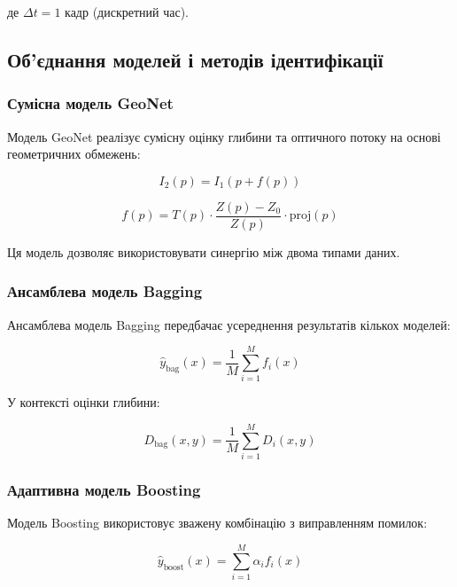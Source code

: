 \documentclass[14pt, a4paper]{extarticle}
\numberwithin{equation}{section}
\begin{document}
де $\Delta t = 1$ кадр (дискретний час).

\subsection{Об'єднання моделей і методів ідентифікації}

\subsubsection{Сумісна модель GeoNet}

Модель GeoNet реалізує сумісну оцінку глибини та оптичного потоку на основі геометричних обмежень:

\begin{equation}
\boxed{I_2(p) = I_1(p + f(p))} \tag{3.29}
\end{equation}

\begin{equation}
f(p) = T(p) \cdot \frac{Z(p) - Z_0}{Z(p)} \cdot \text{proj}(p) \tag{3.30}
\end{equation}

Ця модель дозволяє використовувати синергію між двома типами даних.

\subsubsection{Ансамблева модель Bagging}

Ансамблева модель Bagging передбачає усереднення результатів кількох моделей:

\begin{equation}
\boxed{\hat{y}_{\text{bag}}(x) = \frac{1}{M} \sum_{i=1}^{M} f_i(x)} \tag{3.31}
\end{equation}

У контексті оцінки глибини:

\begin{equation}
D_{\text{bag}}(x,y) = \frac{1}{M} \sum_{i=1}^{M} D_i(x,y) \tag{3.32}
\end{equation}

\subsubsection{Адаптивна модель Boosting}

Модель Boosting використовує зважену комбінацію з виправленням помилок:

\begin{equation}
\hat{y}_{\text{boost}}(x) = \sum_{i=1}^{M} \alpha_i f_i(x) \tag{3.33}
\end{equation}
\end{document}
